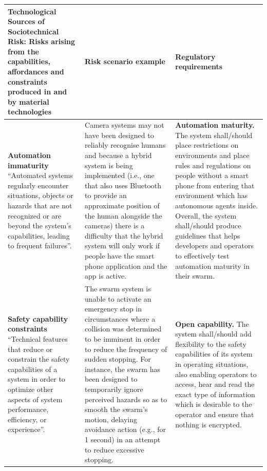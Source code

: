 \documentclass[lettersize,journal]{IEEEtran}
\begin{document}
\begin{landscape}
\begin{table}[]
    \centering
    \begin{tabular}{|p{0.3\textheight}|p{0.35\textheight}|p{0.35\textheight}|}
        \hline
        \textbf{Technological Sources of Sociotechnical Risk:} Risks arising from the capabilities, affordances and constraints produced in and by material technologies & \textbf{Risk scenario example} &	\textbf{Regulatory requirements} \\
        \hline
        \textbf{Automation immaturity} ``Automated systems regularly encounter situations, objects or hazards that are not recognized or are beyond the system’s capabilities, leading to frequent failures”. \cite{macrae2021learning} & Camera systems may not have been designed to reliably recognise humans and because a hybrid system is being implemented (i.e., one that also uses Bluetooth to provide an approximate position of the human alongside the cameras) there is a difficulty that the hybrid system will only work if people have the smart phone application and the app is active. & \textbf{Automation maturity.} The system shall/should place restrictions on environments and place rules and regulations on people without a smart phone from entering that environment which has autonomous agents inside. Overall, the system shall/should produce guidelines that helps developers and operators to effectively test automation maturity in their swarm.\\
        \hline
        \textbf{Safety capability constraints} ``Technical features that reduce or constrain the safety capabilities of a system in order to optimize other aspects of system performance, efficiency, or experience”. \cite{macrae2021learning} & The swarm system is unable to activate an emergency stop in circumstances where a collision was determined to be imminent in order to reduce the frequency of sudden stopping. For instance, the swarm has been designed to temporarily ignore perceived hazards so as to smooth the swarm’s motion, delaying avoidance action (e.g., for 1 second) in an attempt to reduce excessive stopping. & \textbf{Open capability.} The system shall/should add flexibility to the safety capabilities of its system in operating situations, also enabling operators to access, hear and read the exact type of information which is desirable to the operator and ensure that nothing is encrypted.\\
        \hline

\end{tabular}
\end{table}
\end{landscape}
\end{document}
